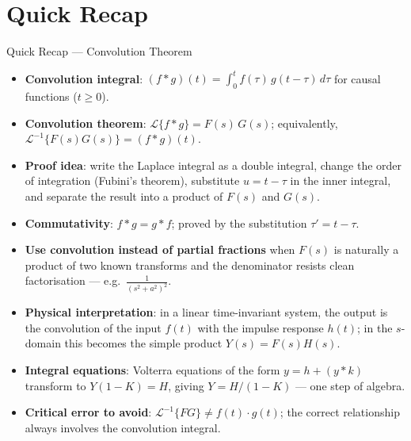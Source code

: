 \documentclass[12pt,a4paper]{article}
\begin{document}
\section{Quick Recap}

\begin{learnbox}{Quick Recap --- Convolution Theorem}
\begin{itemize}[nosep]
  \item \textbf{Convolution integral}:
        $(f*g)(t)=\int_0^t f(\tau)\,g(t-\tau)\,d\tau$ for causal functions ($t\ge 0$).
  \item \textbf{Convolution theorem}:
        $\mathcal{L}\{f*g\}=F(s)\,G(s)$; equivalently,
        $\mathcal{L}^{-1}\{F(s)G(s)\}=(f*g)(t)$.
  \item \textbf{Proof idea}: write the Laplace integral as a double integral, change the order of
        integration (Fubini's theorem), substitute $u=t-\tau$ in the inner integral, and separate
        the result into a product of $F(s)$ and $G(s)$.
  \item \textbf{Commutativity}: $f*g=g*f$; proved by the substitution $\tau'=t-\tau$.
  \item \textbf{Use convolution instead of partial fractions} when $F(s)$ is naturally a product of
        two known transforms and the denominator resists clean factorisation --- e.g.\
        $\frac{1}{(s^2+a^2)^2}$.
  \item \textbf{Physical interpretation}: in a linear time-invariant system, the output is the
        convolution of the input $f(t)$ with the impulse response $h(t)$; in the $s$-domain this
        becomes the simple product $Y(s)=F(s)H(s)$.
  \item \textbf{Integral equations}: Volterra equations of the form $y=h+(y*k)$ transform to
        $Y(1-K)=H$, giving $Y=H/(1-K)$ --- one step of algebra.
  \item \textbf{Critical error to avoid}: $\mathcal{L}^{-1}\{FG\}\ne f(t)\cdot g(t)$; the correct
        relationship always involves the convolution integral.
\end{itemize}
\end{learnbox}
\end{document}
